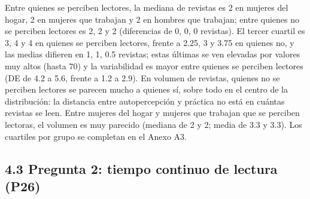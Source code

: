 \documentclass[
  spanish,
  12pt,
]{extarticle}
\begin{document}
Entre quienes se perciben lectores, la mediana de revistas es 2 en
mujeres del hogar, 2 en mujeres que trabajan y 2 en hombres que
trabajan; entre quienes no se perciben lectores es 2, 2 y 2 (diferencias
de 0, 0, 0 revistas). El tercer cuartil es 3, 4 y 4 en quienes se
perciben lectores, frente a 2.25, 3 y 3.75 en quienes no, y las medias
difieren en 1, 1, 0.5 revistas; estas últimas se ven elevadas por
valores muy altos (hasta 70) y la variabilidad es mayor entre quienes se
perciben lectores (DE de 4.2 a 5.6, frente a 1.2 a 2.9). En volumen de
revistas, quienes no se perciben lectores se parecen mucho a quienes sí,
sobre todo en el centro de la distribución: la distancia entre
autopercepción y práctica no está en cuántas revistas se leen. Entre
mujeres del hogar y mujeres que trabajan que se perciben lectoras, el
volumen es muy parecido (mediana de 2 y 2; media de 3.3 y 3.3). Los
cuartiles por grupo se completan en el Anexo A3.

\subsection{4.3 Pregunta 2: tiempo continuo de lectura
(P26)}\label{pregunta-2-tiempo-continuo-de-lectura-p26}
\end{document}
